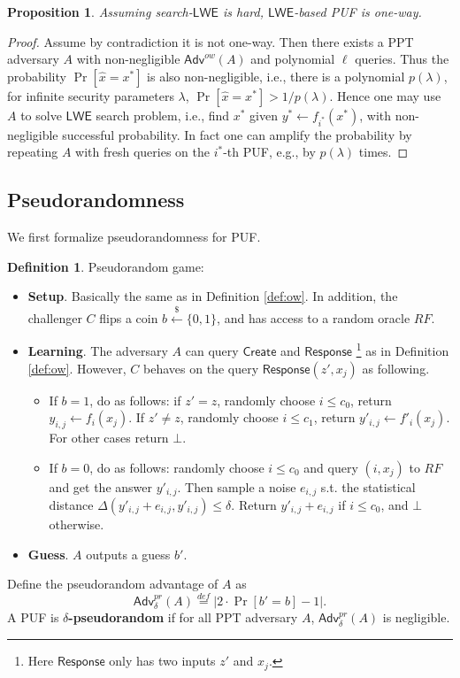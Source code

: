 \documentclass[12pt]{article}
\newcommand{\eqdef}{\stackrel{def}{=}}
\newcommand{\bits}{\{0,1\}}
\newcommand{\getsr}{\stackrel{\$}{\gets}}
\newcommand{\Adv}{\mathsf{Adv}}
\newcommand{\LWE}{\mathsf{LWE}}
\newcommand{\Create}{\mathsf{Create}}
\newcommand{\Response}{\mathsf{Response}}
\newtheorem{proposition}[theorem]{Proposition}
\theoremstyle{definition}
\newtheorem{definition}[theorem]{Definition}
\begin{document}
\begin{proposition}
Assuming search-$\LWE$ is hard, $\LWE$-based PUF is one-way.
\end{proposition}
\begin{proof}
Assume by contradiction it is not one-way. Then there exists a PPT adversary $A$ with non-negligible $\Adv^{ow}(A)$ and polynomial $\ell$ queries. Thus the probability $\Pr[\hat{x} = x^*]$ is also non-negligible, i.e., there is a polynomial $p(\lambda)$, for infinite security parameters $\lambda$, $\Pr[\hat{x} = x^*] > 1/p(\lambda)$. Hence one may use $A$ to solve $\LWE$ search problem, i.e., find $x^*$ given $y^* \gets f_{i^*}(x^*)$, with non-negligible successful probability. In fact one can amplify the probability by repeating $A$ with fresh queries on the $i^*$-th PUF, e.g., by $p(\lambda)$ times.
\end{proof}

\subsection{Pseudorandomness}
We first formalize pseudorandomness for PUF.
\begin{definition}
Pseudorandom game:
\begin{itemize}
\item {\bf Setup}. Basically the same as in Definition \ref{def:ow}. In addition, the challenger $C$ flips a coin $b \getsr \bits$, and has access to a random oracle $RF$.
\item {\bf Learning}. The adversary $A$ can query $\Create$ and $\Response$ \footnote{Here $\Response$ only has two inputs $z'$ and $x_j$.} as in Definition \ref{def:ow}. However, $C$ behaves on the query $\Response(z', x_j)$ as following.
	\begin{itemize}
	\item If $b=1$, do as follows: if $z'=z$, randomly choose $i \leq c_0$, return $y_{i,j} \gets f_i(x_j)$. If $z'\not= z$, randomly choose $i \leq c_1$, return $y'_{i,j} \gets f'_i(x_j)$. For other cases return $\bot$.
	\item If $b=0$, do as follows: randomly choose $i \leq c_0$ and query $(i, x_j)$ to $RF$ and get the answer $y'_{i,j}$. Then sample a noise $e_{i,j}$ s.t. the statistical distance $\Delta(y'_{i,j} + e_{i,j}, y'_{i,j}) \leq \delta$. Return $y'_{i,j} + e_{i,j}$ if $i\leq c_0$, and $\bot$ otherwise.
	\end{itemize}
\item {\bf Guess}. $A$ outputs a guess $b'$.
\end{itemize}
Define the pseudorandom advantage of $A$ as
$$\Adv_{\delta}^{pr}(A) \eqdef |2\cdot \Pr[b'=b] - 1|.$$
A PUF is {\bf $\delta$-pseudorandom} if for all PPT adversary $A$, $\Adv_{\delta}^{pr}(A)$ is negligible.
\end{definition}
\end{document}
